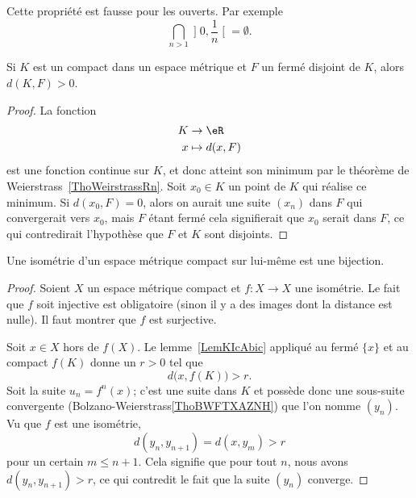 \begin{remark}
    Cette propriété est fausse pour les ouverts. Par exemple
    \begin{equation}
        \bigcap_{n>1}\mathopen] 0 , \frac{1}{ n } \mathclose[=\emptyset.
    \end{equation}
\end{remark}

\begin{lemma}   \label{LemKIcAbic}
    Si \( K\) est un compact dans un espace métrique et \( F\) un fermé disjoint de \( K\), alors \( d(K,F)>0\).
\end{lemma}

\begin{proof}
    La fonction
    \begin{equation}
        \begin{aligned}
             K&\to \eR \\
            x&\mapsto d(x,F)
        \end{aligned}
    \end{equation}
    est une fonction continue sur \( K\), et donc atteint son minimum par le théorème de Weierstrass~\ref{ThoWeirstrassRn}. Soit \( x_0\in K\) un point de \( K\) qui réalise ce minimum. Si \( d(x_0,F)=0\), alors on aurait une suite \( (x_n)\) dans \( F\) qui convergerait vers \( x_0\), mais \( F\) étant fermé cela signifierait que \( x_0\) serait dans \( F\), ce qui contredirait l'hypothèse que \( F\) et \( K\) sont disjoints.
\end{proof}

\begin{proposition}
    Une isométrie d'un espace métrique compact sur lui-même est une bijection.
\end{proposition}

\begin{proof}
    Soient \( X\) un espace métrique compact et \( f\colon X\to X\) une isométrie. Le fait que \( f\) soit injective est obligatoire (sinon il y a des images dont la distance est nulle). Il faut montrer que \( f\) est surjective.

    Soit \( x\in X\) hors de \( f(X)\). Le lemme~\ref{LemKIcAbic} appliqué au fermé \( \{ x \}\) et au compact \( f(K)\) donne un \( r>0\) tel que
    \begin{equation}
        d\big( x,f(K)\big)>r.
    \end{equation}
    Soit la suite \( u_n=f^n(x)\); c'est une suite dans \( K\) et possède donc une sous-suite convergente (Bolzano-Weierstrass\ref{ThoBWFTXAZNH}) que l'on nomme \( (y_n)\). Vu que \( f\) est une isométrie,
    \begin{equation}
        d(y_{n},y_{n+1})=d(x,y_m)>r
    \end{equation}
    pour un certain \( m\leq n+1\). Cela signifie que pour tout \( n\), nous avons \( d(y_n,y_{n+1})>r\), ce qui contredit le fait que la suite \( (y_n)\) converge.
\end{proof}

